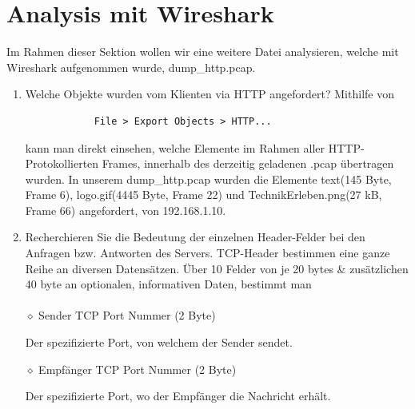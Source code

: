 \documentclass[11pt]{article}
\begin{document}
    \section{Analysis mit Wireshark}
    Im Rahmen dieser Sektion wollen wir eine weitere Datei analysieren, welche mit Wireshark aufgenommen wurde, dump\_http.pcap.
    \begin{enumerate}[\thesection .1]
        \item Welche Objekte wurden vom Klienten via HTTP angefordert?
        Mithilfe von
        \begin{verbatim}
            File > Export Objects > HTTP...
        \end{verbatim}
        kann man direkt einsehen, welche Elemente im Rahmen aller HTTP-Protokollierten Frames, innerhalb des derzeitig geladenen .pcap übertragen wurden.
        In unserem dump\_http.pcap wurden die Elemente text(145 Byte, Frame 6), logo.gif(4445 Byte, Frame 22) und TechnikErleben.png(27 kB, Frame 66) angefordert, von 192.168.1.10.
        \item Recherchieren Sie die Bedeutung der einzelnen Header-Felder bei den Anfragen bzw. Antworten des Servers.
        TCP-Header bestimmen eine ganze Reihe an diversen Datensätzen. Über 10 Felder von je 20 bytes \& zusätzlichen 40 byte
        an optionalen, informativen Daten, bestimmt man\\\\

        $\diamond$ Sender TCP Port Nummer (2 Byte)
        \begin{addmargin}[1em]{1em}
            Der spezifizierte Port, von welchem der Sender sendet.
        \end{addmargin}

        $\diamond$ Empfänger TCP Port Nummer (2 Byte)
        \begin{addmargin}[1em]{1em}
            Der spezifizierte Port, wo der Empfänger die Nachricht erhält.
        \end{addmargin}


\end{enumerate}
\end{document}

